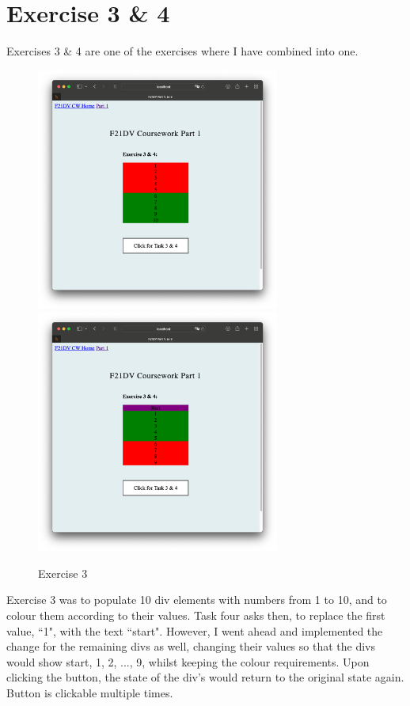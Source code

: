 \documentclass{scrreprt}
\begin{document}
\section{Exercise 3 \& 4}
Exercises 3 \& 4 are one of the exercises where I have combined into one.
\begin{figure}[!ht]
    \centering
    \includegraphics[width = 8cm]{images/ex3_1.png}
    \includegraphics[width = 8cm]{images/ex3_2.png}
    \label{fig:ex3}
    \caption{Exercise 3}
\end{figure}
\FloatBarrier
Exercise 3 was to populate 10 div elements with numbers from 1 to 10, and to colour them according to
their values. Task four asks then, to replace the first value, ``1", with the text ``start". However, I
went ahead and implemented the change for the remaining divs as well, changing their values so that
the divs would show start, 1, 2, ..., 9, whilst keeping the colour requirements. Upon clicking the
button, the state of the div's would return to the original state again. Button is clickable multiple
times.
\end{document}
